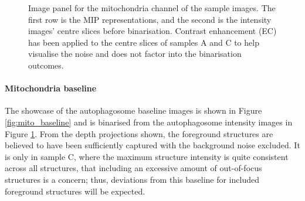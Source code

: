 \begin{figure}[ht!]
	\caption[Image panel of the mitochondria sample intensity images used in binarisation.]{Image panel for the mitochondria channel of the sample images. The first row is the MIP representations, and the second is the intensity images' centre slices before binarisation. Contrast enhancement (EC) has been applied to the centre slices of samples A and C to help visualise the noise and does not factor into the binarisation outcomes.}
	\label{fig:mitochondria_raw}
\end{figure}
\FloatBarrier
\paragraph{Mitochondria baseline}
The showcase of the autophagosome baseline images is shown in Figure \ref{fig:mito_baseline} and is binarised from the autophagosome intensity images in Figure \ref{fig:mitochondria_raw}. From the depth projections shown, the foreground structures are believed to have been sufficiently captured with the background noise excluded. It is only in sample C, where the maximum structure intensity is quite consistent across all structures, that including an excessive amount of out-of-focus structures is a concern; thus, deviations from this baseline for included foreground structures will be expected.


